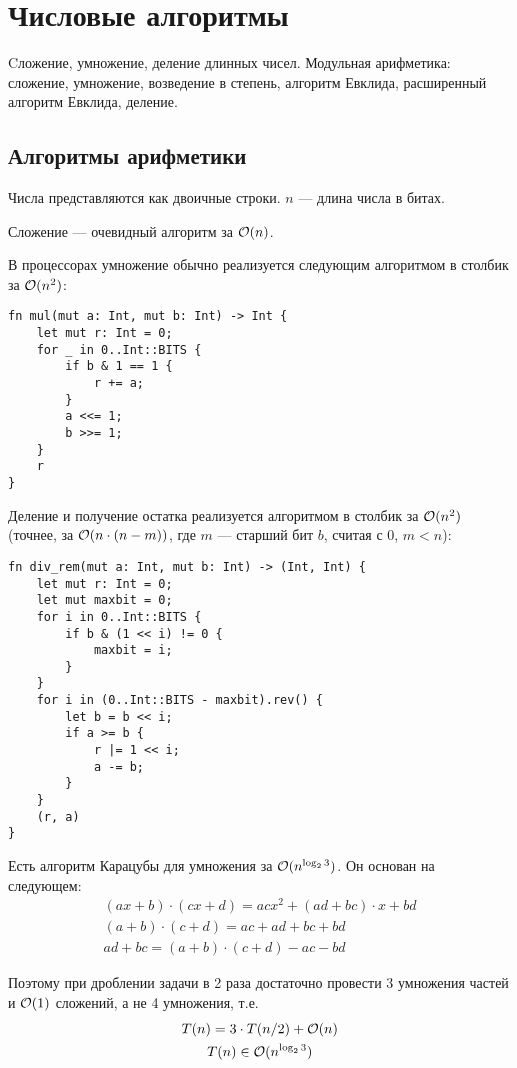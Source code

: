 \section{Числовые алгоритмы}
Cложение, умножение, деление длинных чисел.
Модульная арифметика: сложение, умножение,
возведение в степень, алгоритм Евклида,
расширенный алгоритм Евклида, деление.

\subsection{Алгоритмы арифметики}
Числа представляются как двоичные строки.
$n$ --- длина числа в битах.

Сложение --- очевидный алгоритм за $\mathcal{O}(n)$.

В процессорах умножение обычно
реализуется следующим алгоритмом в столбик
за $\mathcal{O}(n^2)$:
\begin{verbatim}
fn mul(mut a: Int, mut b: Int) -> Int {
    let mut r: Int = 0;
    for _ in 0..Int::BITS {
        if b & 1 == 1 {
            r += a;
        }
        a <<= 1;
        b >>= 1;
    }
    r
}
\end{verbatim}

Деление и получение остатка реализуется
алгоритмом в столбик
за $\mathcal{O}(n^2)$
(точнее, за $\mathcal{O}(n \cdot (n - m))$,
где $m$ --- старший бит $b$, считая с 0, $m < n$):
\begin{verbatim}
fn div_rem(mut a: Int, mut b: Int) -> (Int, Int) {
    let mut r: Int = 0;
    let mut maxbit = 0;
    for i in 0..Int::BITS {
        if b & (1 << i) != 0 {
            maxbit = i;
        }
    }
    for i in (0..Int::BITS - maxbit).rev() {
        let b = b << i;
        if a >= b {
            r |= 1 << i;
            a -= b;
        }
    }
    (r, a)
}
\end{verbatim}

Есть алгоритм Карацубы для умножения
за $\mathcal{O}(n^{\log_2 3})$.
Он основан на следующем:
\begin{gather*}
    (ax + b) \cdot (cx + d)
    = ac x^2 + (ad + bc) \cdot x + bd \\
    (a + b) \cdot (c + d)
    = ac + ad + bc + bd \\
    ad + bc = (a + b) \cdot (c + d) - ac - bd
\end{gather*}

Поэтому при дроблении задачи в 2 раза
достаточно провести 3 умножения частей
и $\mathcal{O}(1)$ сложений, а не 4 умножения,
т.е.
\begin{gather*}
    T(n) = 3 \cdot T(n/2) + \mathcal{O}(n) \\
    T(n) \in \mathcal{O}(n^{\log_2 3})
\end{gather*}

